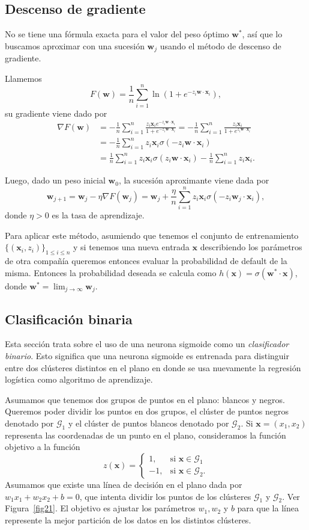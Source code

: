 \documentclass[12pt, a4paper]{amsbook}
\newcommand{\G}{{\mathcal G}}
\newcommand{\ww}{{\mathbf w}}
\newcommand{\xx}{{\mathbf x}}
\theoremstyle{remark}
\theoremstyle{definition}
\numberwithin{section}{chapter}
\numberwithin{subsection}{section}
\numberwithin{equation}{section}
\numberwithin{figure}{chapter}
\begin{document}
\subsection*{Descenso de gradiente} No se tiene una fórmula exacta para el valor del peso óptimo $\ww^*$, así que lo buscamos aproximar con una sucesión $\ww_j$ usando el método de descenso de gradiente.

Llamemos
$$
F(\ww) =  \frac{1}{n}\sum_{i=1}^n \ln(1+e^{-z_i\ww\cdot\xx_i}),
$$
su gradiente viene dado por
\begin{align*}
\nabla F(\ww) &= -\frac{1}{n}\sum_{i=1}^n \frac{z_i \xx_i e^{-z_i\ww\cdot\xx_i}}{1+ e^{-z_i\ww\cdot\xx_i}} = -\frac{1}{n}\sum_{i=1}^n \frac{z_i\xx_i}{1+e^{z_i\ww\cdot\xx_i}}\\
&= -\frac{1}{n}\sum_{i=1}^n z_i\xx_i \sigma(-z_i\ww\cdot\xx_i)\\
&=\frac{1}{n}\sum_{i=1}^nz_i\xx_i \sigma(z_i\ww\cdot\xx_i) - \frac{1}{n}\sum_{i=1}^nz_i\xx_i.
\end{align*}

Luego, dado un peso inicial $\ww_0$, la sucesión aproximante viene dada por
$$
\ww_{j+1} = \ww_j - \eta\nabla F(\ww_j) = \ww_j + \frac{\eta}{n}\sum_{i=1}^n z_i\xx_i\sigma(-z_i\ww_j\cdot\xx_i), 
$$
donde $\eta>0$ es la tasa de aprendizaje.

Para aplicar este método, asumiendo que tenemos el conjunto de entrenamiento $\{(\xx_i, z_i)\}_{1\le i\le n}$ y si tenemos una nueva entrada $\xx$ describiendo los parámetros de otra compañía queremos entonces evaluar la probabilidad de default de la misma. Entonces la probabilidad deseada se calcula como $h(\xx) = \sigma(\ww^*\cdot\xx)$, donde $\ww^*=\lim_{j\to\infty} \ww_j$.

\subsection{Clasificación binaria}
Esta sección trata sobre el uso de una neurona sigmoide como un {\em clasificador binario}. Esto significa que una neurona sigmoide es entrenada para distinguir entre dos clústeres distintos en el plano en donde se usa nuevamente la regresión logística como algoritmo de aprendizaje.

Asumamos que tenemos dos grupos de puntos en el plano: blancos y negros. Queremos poder dividir los puntos en dos grupos, el clúster de puntos negros denotado por $\G_1$ y el clúster de puntos blancos denotado por $\G_2$. Si $\xx = (x_1, x_2)$ representa las coordenadas de un punto en el plano, consideramos la función objetivo a la función
$$
z(\xx) = \begin{cases}
1,&\text{si } \xx\in \G_1\\
-1, & \text{si } \xx\in \G_2.
\end{cases}
$$
Asumamos que existe una línea de decisión en el plano dada por $w_1 x_1 + w_2 x_2 + b=0$, que intenta dividir los puntos de los clústeres $\G_1$ y $\G_2$. Ver Figura~\ref{fig21}. El objetivo es ajustar los parámetros $w_1, w_2$ y $b$ para que la línea represente la mejor partición de los datos en los distintos clústeres.
\end{document}

